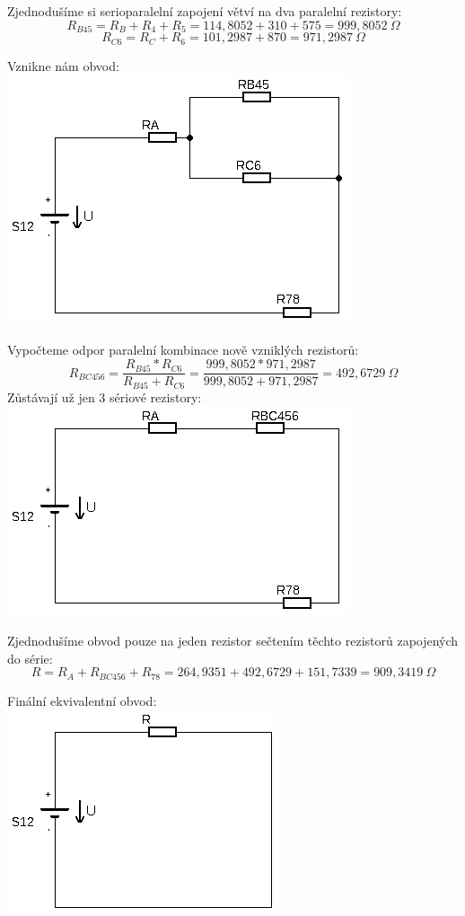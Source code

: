 Zjednodušíme si serioparalelní zapojení větví na dva paralelní rezistory:
{\large$$R_{B45} = R_B + R_4 + R_5 = 114,8052 + 310 + 575 = 999,8052\:\Omega$$}
{\large$$R_{C6} = R_C + R_6 = 101,2987 + 870 = 971,2987\:\Omega$$}

Vznikne nám obvod: \\

\includegraphics[totalheight=6cm]{fig/1_4.png}

Vypočteme odpor paralelní kombinace nově vzniklých rezistorů:
{\large$$R_{BC456} = \frac{R_{B45} * R_{C6}}{R_{B45} + R_{C6}} = \frac{999,8052 * 971,2987}{999,8052 + 971,2987} = 492,6729\:\Omega$$}
Zůstávají už jen 3 sériové rezistory: \\

\includegraphics[totalheight=6cm]{fig/1_5.png}

Zjednodušíme obvod pouze na jeden rezistor sečtením těchto rezistorů zapojených do série:
{\large$$R = R_A + R_{BC456} + R_{78} = 264,9351 + 492,6729 + 151,7339 = 909,3419\:\Omega$$}

Finální ekvivalentní obvod: \\

\includegraphics[totalheight=6cm]{fig/1_6.png}

